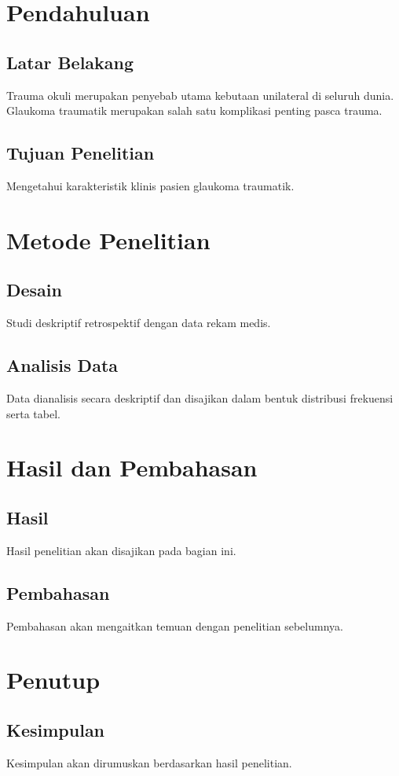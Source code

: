 \documentclass[12pt]{report}
\newcommand{\frameworkRoot}{../../}
\begin{document}



\chapter{Pendahuluan}
\section{Latar Belakang}
Trauma okuli merupakan penyebab utama kebutaan unilateral di seluruh
dunia.\supercite{whoBlindnessVisionImpairment2023} Glaukoma traumatik merupakan
salah satu komplikasi penting pasca trauma.\supercite{santosoKarakteristikGlaukomaTraumatik2020}

\section{Tujuan Penelitian}
Mengetahui karakteristik klinis pasien glaukoma traumatik.

\chapter{Metode Penelitian}
\section{Desain}
Studi deskriptif retrospektif dengan data rekam medis.

\section{Analisis Data}
Data dianalisis secara deskriptif dan disajikan dalam bentuk distribusi
frekuensi serta tabel.


\chapter{Hasil dan Pembahasan}
\section{Hasil}
Hasil penelitian akan disajikan pada bagian ini.

\section{Pembahasan}
Pembahasan akan mengaitkan temuan dengan penelitian sebelumnya.

\chapter{Penutup}
\section{Kesimpulan}
Kesimpulan akan dirumuskan berdasarkan hasil penelitian.

\printbibliography[title={Daftar Pustaka}]
\end{document}
